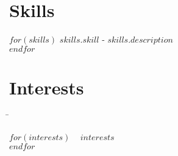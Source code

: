 \documentclass[$fontsize$]{article} %
\newcommand{\sqbullet}{~\vrule height 1ex width .8ex depth -.2ex} %
\newcommand{\interestsgroup}[1]{
\begin{tabbing}
\hspace{3mm} \= \kill
#1
\end{tabbing}
\vspace{-10mm}
}
\newcommand{\interest}[1]{\sqbullet \> \textbf{#1}\\[3pt]} %
\begin{document}
\section{Skills}
$for(skills)$
\textit{$skills.skill$} - $skills.description$\\
$endfor$


\section{Interests}

\interestsgroup{
$for(interests)$
\interest{$interests$}
$endfor$
}
\end{document}
